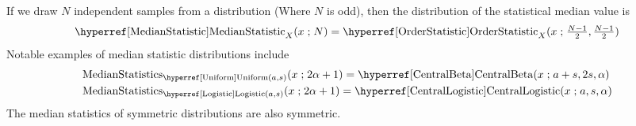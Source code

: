 

 If we draw $N$ independent samples from a distribution (Where $N$ is odd), then the distribution of the statistical median value is 
\label{MedianStatistic}
\begin{align*}
\opr{MedianStatistic}_{X}(x \given N) = \opr{OrderStatistic}_{X}(x \given \tfrac{N-1}{2},  \tfrac{N-1}{2})
\checked
\end{align*}
Notable examples of median statistic distributions include
\begin{align*}
\op{MedianStatistics}&_{\opr{Uniform}(a,s)}(x \given 2 \alpha +1 )
=  \opr{CentralBeta}(x\given a+s, 2s, \alpha)
\checked
\\
\op{MedianStatistics}&_{\opr{Logistic}(a,s)}  (x \given 2 \alpha +1)
=  \opr{CentralLogistic}(x\given a, s, \alpha)
\checked
\end{align*}
The median statistics of symmetric distributions are also symmetric.



